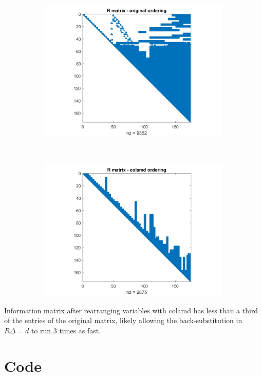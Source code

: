 \documentclass[a4paper]{scrreprt}
\begin{document}
\chapter{}
\begin{figure}[h]
	\centering
	\begin{subfigure}[t]{.7\textwidth}
		\centering
		\includegraphics[width=\linewidth]{original_R.jpg}
		\caption{}
	\end{subfigure}
	\\
	\begin{subfigure}[t]{.7\textwidth}
		\centering
		\includegraphics[width=\linewidth]{new_R.jpg}
		\caption{}
	\end{subfigure}	
\end{figure}
Information matrix after rearranging variables with colamd has less than a third of the entries of the original matrix, likely allowing the back-substitution in $R\Delta =d$ to run 3 times as fast. 


\chapter{Code}

\end{document}
